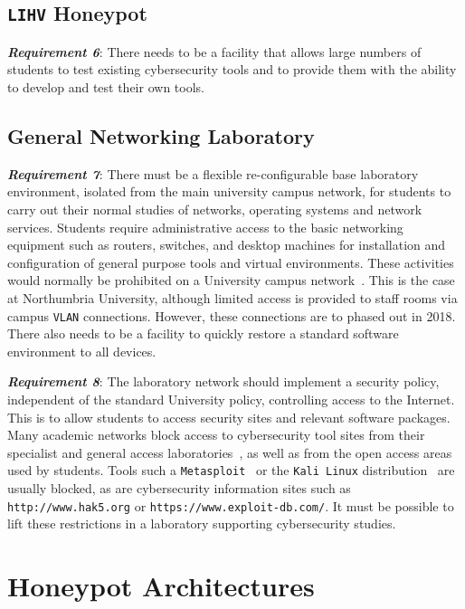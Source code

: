 \documentclass{ieeeaccess}
\begin{document}
\subsection{\texttt{LIHV} Honeypot}\label{subsec:LabHoneypot}

\noindent\textit{\textbf{Requirement 6}}:
There needs to be a facility that allows large numbers of students to test
existing cybersecurity tools and to provide them with the ability to develop
and test their own tools.

\subsection{General Networking Laboratory}\label{subsec:GeneralLab}

\noindent\textit{\textbf{Requirement 7}}: There must be a flexible
re-configurable base laboratory environment, isolated from the main university
campus network, for students to carry out their normal studies of networks,
operating systems and network services. Students require administrative access
to the basic networking equipment such as routers, switches, and desktop
machines for installation and configuration of general purpose tools and
virtual environments. These activities would normally be prohibited on a
University campus network~\cite{MGDL:13}. This is the case at Northumbria
University, although limited access is provided to staff rooms via campus
\texttt{VLAN} connections. However, these connections are to phased out in
2018. There also needs to be a facility to quickly restore a standard software
environment to all devices.  

\noindent\textit{\textbf{Requirement 8}}: The laboratory network should
implement a security policy, independent of the standard University policy,
controlling access to the Internet. This is to allow students to access
security sites and relevant software packages. Many academic networks block
access to cybersecurity tool sites from their specialist and general access
laboratories~\cite{ACGO:06,YYLCHJ:04}, as well as from the open access areas
used by students. Tools such a \texttt{Metasploit}~\cite{R7:17} or the
\texttt{Kali Linux} distribution~\cite{OS:17} are usually blocked, as are
cybersecurity information sites such as \texttt{http://www.hak5.org} or
\texttt{https://www.exploit-db.com/}. It must be possible to lift these
restrictions in a laboratory supporting cybersecurity studies.

\section{Honeypot Architectures}\label{sec:HoneyArch}
\end{document}
